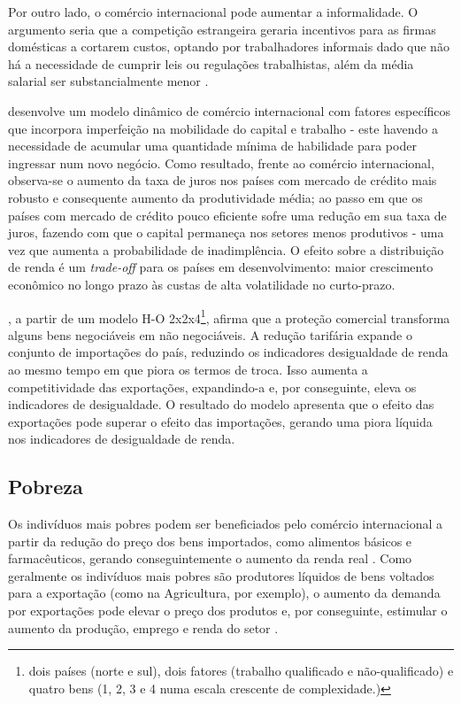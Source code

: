 Por outro lado, o comércio internacional pode aumentar a informalidade. O argumento seria que a competição estrangeira geraria incentivos para as firmas domésticas a cortarem custos, optando por trabalhadores informais \cite{goldbergpavcnik04} dado que não há a necessidade de cumprir leis ou regulações trabalhistas, além da média salarial ser substancialmente menor \cite{bargain14}.

\textcite{banerjee04} desenvolve um modelo dinâmico de comércio internacional com fatores específicos que incorpora imperfeição na mobilidade do capital e trabalho - este havendo a necessidade de acumular uma quantidade mínima de habilidade para poder ingressar num novo negócio. Como resultado, frente ao comércio internacional, observa-se o aumento da taxa de juros nos países com mercado de crédito mais robusto e consequente aumento da produtividade média; ao passo em que os países com mercado de crédito pouco eficiente sofre uma redução em sua taxa de juros, fazendo com que o capital permaneça nos setores menos produtivos - uma vez que aumenta a probabilidade de inadimplência. O efeito sobre a distribuição de renda é um \textit{trade-off} para os países em desenvolvimento: maior crescimento econômico no longo prazo às custas de alta volatilidade no curto-prazo.

\textcite{xu03}, a partir de um modelo H-O 2x2x4\footnote{dois países (norte e sul), dois fatores (trabalho qualificado e não-qualificado) e quatro bens (1, 2, 3 e 4 numa escala crescente de complexidade.)}, afirma que a proteção comercial transforma alguns bens negociáveis em não negociáveis. A redução tarifária expande o conjunto de importações do país, reduzindo os indicadores desigualdade de renda ao mesmo tempo em que piora os termos de troca. Isso aumenta a competitividade das exportações, expandindo-a e, por conseguinte, eleva os indicadores de desigualdade. O resultado do modelo apresenta que o efeito das exportações pode superar o efeito das importações, gerando uma piora líquida nos indicadores de desigualdade de renda.

\subsection{Pobreza} \label{subsec:pobreza}

Os indivíduos mais pobres podem ser beneficiados pelo comércio internacional a partir da redução do preço dos bens importados, como alimentos básicos e farmacêuticos, gerando conseguintemente o aumento da renda real \cite{bannisterthugge01}. Como geralmente os indivíduos mais pobres são produtores líquidos de bens voltados para a exportação (como na Agricultura, por exemplo), o aumento da demanda por exportações pode elevar o preço dos produtos e, por conseguinte, estimular o aumento da produção, emprego e renda do setor \cite{bannisterthugge01}.

